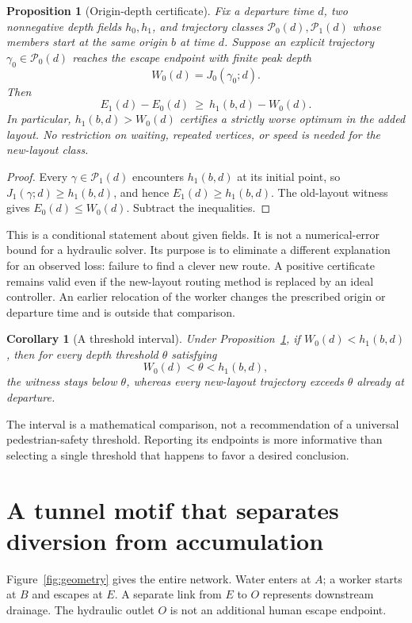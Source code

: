 \documentclass[11pt]{article}
\newtheorem{proposition}{Proposition}
\newtheorem{corollary}{Corollary}
\newcommand{\Paths}{\mathcal P}
\begin{document}
\begin{proposition}[Origin-depth certificate]\label{prop:certificate}
Fix a departure time \(d\), two nonnegative depth fields \(h_0,h_1\), and trajectory classes \(\Paths_0(d),\Paths_1(d)\) whose members start at the same origin \(b\) at time \(d\). Suppose an explicit trajectory \(\gamma_0\in\Paths_0(d)\) reaches the escape endpoint with finite peak depth
\[
  W_0(d)=J_0(\gamma_0;d).
\]
Then
\begin{equation}
 E_1(d)-E_0(d)\ \geq\ h_1(b,d)-W_0(d).                    \label{eq:certificate}
\end{equation}
In particular, \(h_1(b,d)>W_0(d)\) certifies a strictly worse optimum in the added layout. No restriction on waiting, repeated vertices, or speed is needed for the new-layout class.
\end{proposition}
\begin{proof}
Every \(\gamma\in\Paths_1(d)\) encounters \(h_1(b,d)\) at its initial point, so \(J_1(\gamma;d)\geq h_1(b,d)\), and hence \(E_1(d)\geq h_1(b,d)\). The old-layout witness gives \(E_0(d)\leq W_0(d)\). Subtract the inequalities.
\end{proof}

This is a conditional statement about given fields. It is not a numerical-error bound for a hydraulic solver. Its purpose is to eliminate a different explanation for an observed loss: failure to find a clever new route. A positive certificate remains valid even if the new-layout routing method is replaced by an ideal controller. An earlier relocation of the worker changes the prescribed origin or departure time and is outside that comparison.

\begin{corollary}[A threshold interval]\label{cor:threshold}
Under Proposition~\ref{prop:certificate}, if \(W_0(d)<h_1(b,d)\), then for every depth threshold \(\theta\) satisfying
\[
 W_0(d)<\theta<h_1(b,d),
\]
the witness stays below \(\theta\), whereas every new-layout trajectory exceeds \(\theta\) already at departure.
\end{corollary}
The interval is a mathematical comparison, not a recommendation of a universal pedestrian-safety threshold. Reporting its endpoints is more informative than selecting a single threshold that happens to favor a desired conclusion.

\section{A tunnel motif that separates diversion from accumulation}
Figure~\ref{fig:geometry} gives the entire network. Water enters at \(A\); a worker starts at \(B\) and escapes at \(E\). A separate link from \(E\) to \(O\) represents downstream drainage. The hydraulic outlet \(O\) is not an additional human escape endpoint.
\end{document}
